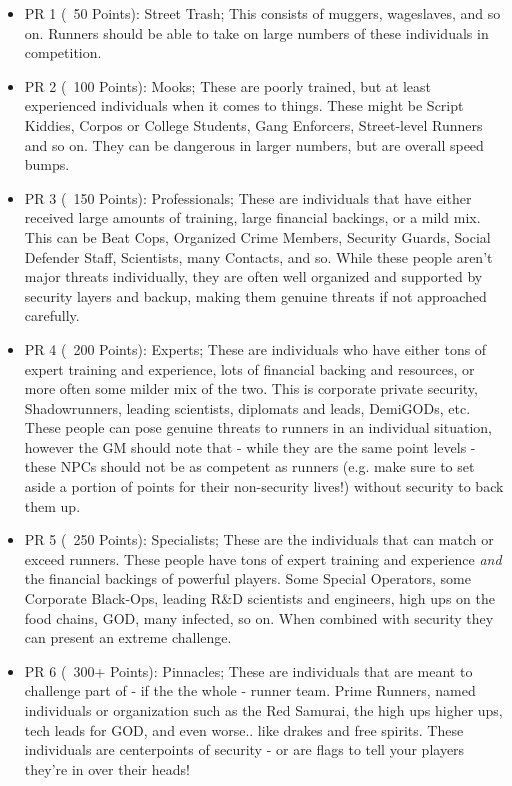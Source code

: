 \begin{multicols*}{2}
	\begin{itemize}
		\item PR 1 (~50 Points): Street Trash; This consists of muggers, wageslaves, and so on. Runners should be able to take on large numbers of these individuals in competition.
		\item PR 2 (~100 Points): Mooks; These are poorly trained, but at least experienced individuals when it comes to things. These might be Script Kiddies, Corpos or College Students, Gang Enforcers, Street-level Runners and so on. They can be dangerous in larger numbers, but are overall speed bumps.
		\item PR 3 (~150 Points): Professionals; These are individuals that have either received large amounts of training, large financial backings, or a mild mix. This can be Beat Cops, Organized Crime Members, Security Guards, Social Defender Staff, Scientists, many Contacts, and so. While these people aren't major threats individually, they are often well organized and supported by security layers and backup, making them genuine threats if not approached carefully.
		\item PR 4 (~200 Points): Experts; These are individuals who have either tons of expert training and experience, lots of financial backing and resources, or more often some milder mix of the two. This is corporate private security, Shadowrunners, leading scientists, diplomats and leads, DemiGODs, etc. These people can pose genuine threats to runners in an individual situation, however the GM should note that - while they are the same point levels - these NPCs should not be as competent as runners (e.g. make sure to set aside a portion of points for their non-security lives!) without security to back them up.
		\item PR 5 (~250 Points): Specialists; These are the individuals that can match or exceed runners. These people have tons of expert training and experience \textit{and} the financial backings of powerful players. Some Special Operators, some Corporate Black-Ops, leading R\&D scientists and engineers, high ups on the food chains, GOD, many infected, so on. When combined with security they can present an extreme challenge.
		\item PR 6 (~300+ Points): Pinnacles; These are individuals that are meant to challenge part of - if the the whole - runner team. Prime Runners, named individuals or organization such as the Red Samurai, the high ups higher ups, tech leads for GOD, and even worse.. like drakes and free spirits. These individuals are centerpoints of security - or are flags to tell your players they're in over their heads!
	\end{itemize}
	

\end{multicols*}
